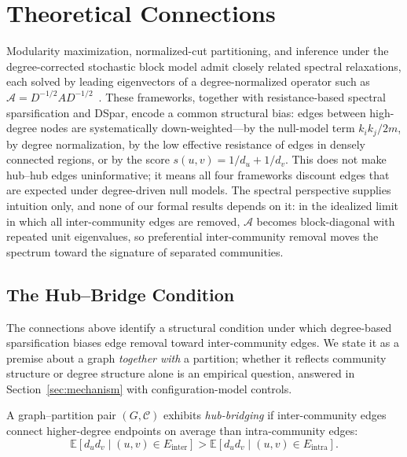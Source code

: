 \section{Theoretical Connections}
\label{sec:theory}

Modularity maximization, normalized-cut partitioning, and inference under the degree-corrected stochastic block model admit closely related spectral relaxations, each solved by leading eigenvectors of a degree-normalized operator such as $\mathcal{A} = D^{-1/2} A D^{-1/2}$~\cite{newman2013spectral, karrer2011stochastic, shi2000normalized}.
These frameworks, together with resistance-based spectral sparsification and DSpar, encode a common structural bias: edges between high-degree nodes are systematically down-weighted---by the null-model term $k_i k_j / 2m$, by degree normalization, by the low effective resistance of edges in densely connected regions, or by the score $s(u,v) = 1/d_u + 1/d_v$.
This does not make hub--hub edges uninformative; it means all four frameworks discount edges that are expected under degree-driven null models.
The spectral perspective supplies intuition only, and none of our formal results depends on it: in the idealized limit in which all inter-community edges are removed, $\mathcal{A}$ becomes block-diagonal with repeated unit eigenvalues, so preferential inter-community removal moves the spectrum toward the signature of separated communities.

\subsection{The Hub--Bridge Condition}
\label{sec:hub-bridge}

The connections above identify a structural condition under which degree-based sparsification biases edge removal toward inter-community edges. We state it as a premise about a graph \emph{together with} a partition; whether it reflects community structure or degree structure alone is an empirical question, answered in Section~\ref{sec:mechanism} with configuration-model controls.

\begin{hypothesis}
\label{hyp:hub-bridge}
A graph--partition pair $(G, \mathcal{C})$ exhibits \emph{hub-bridging} if
inter-community edges connect higher-degree endpoints on average than
intra-community edges:
\begin{equation}
\mathbb{E}\!\left[d_u d_v \mid (u,v)\in E_{\mathrm{inter}}\right]
>
\mathbb{E}\!\left[d_u d_v \mid (u,v)\in E_{\mathrm{intra}}\right].
\label{eq:hub-bridge}
\end{equation}
\end{hypothesis}

